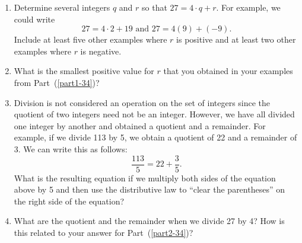 \begin{previewactivity}\label{PA:quotients} \hfill
\begin{enumerate}
\item Determine several integers  $q$  and  $r$  so that  $27 = 4 \cdot q + r$. For example, we could write
\[
27 = 4 \cdot 2 + 19 \text{ and }  27 = 4\left( 9 \right) + \left( { - 9} \right).
\]
Include at least five other examples where  $r$  is positive and at least two other examples where  $r$  is negative.
\label{part1-34}%

\item What is the smallest positive value for  $r$  that you obtained in your examples from Part~(\ref{part1-34})? 
\label{part2-34}%

\item Division is not considered an operation on the set of integers since the quotient of two integers need not be an integer.  However, we have all divided one integer by another and obtained a quotient and a remainder.  For example, if we divide 113 by 5, we obtain a quotient of 22 and a remainder of 3.  We can write this as follows:
\[
\frac{{113}}{5} = 22 + \frac{3}{5}.
\]
What is the resulting equation if we multiply both sides of the equation above by 5 and then use the distributive law to ``clear the parentheses'' on the right side of the equation?

\item What are the quotient and the remainder when we divide  27  by  4?  How is this related to your answer for Part~(\ref{part2-34})?

\end{enumerate}
\end{previewactivity}
\hbreak

